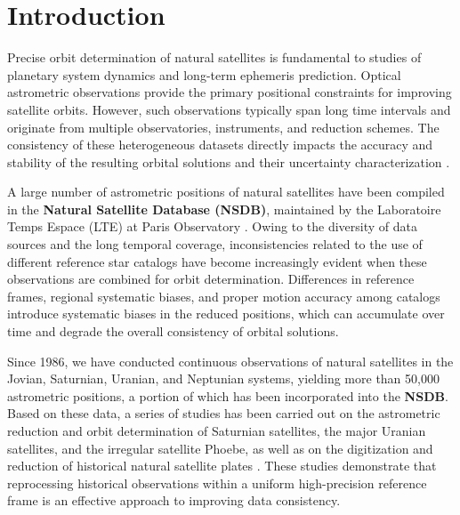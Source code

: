 \documentclass[linenumbers,amsmath,manuscript]{aastex702}
\begin{document}

\section{Introduction} \label{sec:intro}

Precise orbit determination of natural satellites is fundamental to studies of planetary system dynamics and long-term ephemeris prediction. Optical astrometric observations provide the primary positional constraints for improving satellite orbits. However, such observations typically span long time intervals and originate from multiple observatories, instruments, and reduction schemes. The consistency of these heterogeneous datasets directly impacts the accuracy and stability of the resulting orbital solutions and their uncertainty characterization \citep{Desmars2013}.

A large number of astrometric positions of natural satellites have been compiled in the \textbf{Natural Satellite Database (NSDB)}, maintained by the Laboratoire Temps Espace (LTE) at Paris Observatory \textbf{\citep{2024A&A...691A.295A}}. Owing to the diversity of data sources and the long temporal coverage, inconsistencies related to the use of different reference star catalogs have become increasingly evident when these observations are combined for orbit determination. Differences in reference frames, regional systematic biases, and proper motion accuracy among catalogs introduce systematic biases in the reduced positions, which can accumulate over time and degrade the overall consistency of orbital solutions.

Since 1986, we have conducted continuous observations of natural satellites in the Jovian, Saturnian, Uranian, and Neptunian systems, yielding more than 50,000 astrometric positions, a portion of which has been incorporated into the \textbf{NSDB}. Based on these data, a series of studies has been carried out on the astrometric reduction and orbit determination of Saturnian satellites, the major Uranian satellites, and the irregular satellite Phoebe, as well as on the digitization and reduction of historical natural satellite plates \citep{Qiao1999,Shen2002,Qiao2006Phoebe,Yan2016Plates}. These studies demonstrate that reprocessing historical observations within a uniform high-precision reference frame is an effective approach to improving data consistency.
\end{document}
